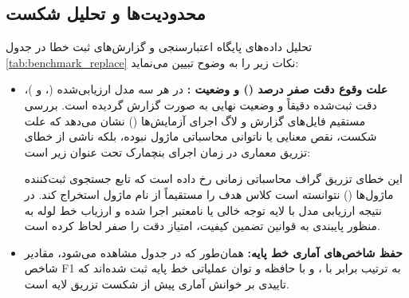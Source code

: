 \subsection{محدودیت‌ها و تحلیل شکست}
تحلیل داده‌های پایگاه اعتبارسنجی و گزارش‌های ثبت خطا در جدول \ref{tab:benchmark_replace} نکات زیر را به وضوح تبیین می‌نماید:
\begin{itemize}
    \item \textbf{علت وقوع دقت صفر درصد () و وضعیت :} در هر سه مدل ارزیابی‌شده (،  و )، دقت ثبت‌شده دقیقاً  و وضعیت نهایی به صورت  گزارش گردیده است. بررسی مستقیم فایل‌های گزارش و لاگ اجرای آزمایش‌ها () نشان می‌دهد که علت شکست، نقص معنایی یا ناتوانی محاسباتی ماژول نبوده، بلکه ناشی از خطای تزریق معماری در زمان اجرای بنچمارک تحت عنوان زیر است:
    \begin{center}
    \end{center}
    این خطای تزریق گراف محاسباتی زمانی رخ داده است که تابع جستجوی ثبت‌کننده ماژول‌ها () نتوانسته است کلاس هدف را مستقیماً از نام ماژول استخراج کند. در نتیجه ارزیابی مدل با لایه توجه خالی یا نامعتبر اجرا شده و ارزیاب خط لوله به منظور پایبندی به قوانین تضمین کیفیت، امتیاز دقت را صفر لحاظ کرده است.
    \item \textbf{حفظ شاخص‌های آماری خط پایه:} همان‌طور که در جدول مشاهده می‌شود، مقادیر شاخص F1 به ترتیب برابر با ،  و  با حافظه و توان عملیاتی خط پایه ثبت شده‌اند که تاییدی بر خوانش آماری پیش از شکست تزریق لایه است.
\end{itemize}
